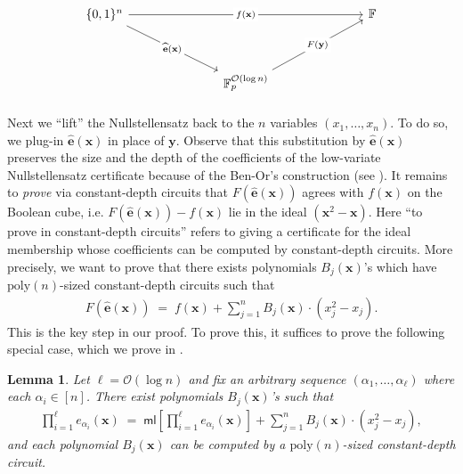 \documentclass[11pt]{article}
\newtheorem{lemma}[theorem]{Lemma}
\newcommand{\bigO}{\mathcal{O}}
\newcommand{\brac}[1]{\left[ #1 \right]}
\newcommand{\ml}{\mathsf{ml}}
\begin{document}
\[\begin{tikzcd}
	{\{0,1\}^{n}} &&&&&& {\mathbb{F}} \\
	\\
	&&& {\mathbb{F}_{p}^{\mathcal{O}(\log n)}}
	\arrow["{f(\mathbf{x})}"{description}, from=1-1, to=1-7]
	\arrow["{\widehat{\mathbf{e}}(\mathbf{x})}"{description}, from=1-1, to=3-4]
	\arrow["{F(\mathbf{y})}"{description}, from=3-4, to=1-7]
\end{tikzcd}\]



\paragraph{}Next we ``lift'' the Nullstellensatz back to the $n$ variables $(x_{1},\ldots,x_{n})$. To do so, we plug-in $\widehat{\mathbf{e}}(\mathbf{x})$ in place of $\mathbf{y}$. Observe that this substitution by $\widehat{\mathbf{e}}(\mathbf{x})$ preserves the size and the depth of the coefficients of the low-variate Nullstellensatz certificate because of the Ben-Or's construction (see ).\newline
It remains to \emph{prove} via constant-depth circuits that $F(\widehat{\mathbf{e}}(\mathbf{x}))$ agrees with $f(\mathbf{x})$ on the Boolean cube, i.e. $F(\widehat{\mathbf{e}}(\mathbf{x})) - f(\mathbf{x})$ lie in the ideal $(\mathbf{x}^{2} - \mathbf{x})$. Here ``to prove in constant-depth circuits'' refers to giving a certificate for the ideal membership whose coefficients can be computed by constant-depth circuits. More precisely, we want to prove that there exists polynomials $B_{j}(\mathbf{x})$'s which have $\mathrm{poly}(n)$-sized constant-depth circuits such that
\begin{align*}
    F(\widehat{\mathbf{e}}(\mathbf{x})) \; = \; f(\mathbf{x}) + \sum_{j=1}^{n} B_{j}(\mathbf{x}) \cdot (x_{j}^{2} - x_{j}).
\end{align*}
This is the key step in our proof. To prove this, it suffices to prove the following special case, which we prove in .



\begin{lemma}
Let $\ell = \bigO(\log n)$ and fix an arbitrary sequence $(\alpha_{1},\ldots,\alpha_{\ell})$ where each $\alpha_{i} \in [n]$. There exist polynomials $B_{j}(\mathbf{x})$'s such that
\begin{align*}
    \prod_{i = 1}^{\ell} e_{\alpha_{i}}(\mathbf{x}) \; = \; \ml\brac{\prod_{i = 1}^{\ell} e_{\alpha_{i}}(\mathbf{x})} + \sum_{j=1}^{n} B_{j}(\mathbf{x}) \cdot (x_{j}^{2} - x_{j}),
\end{align*}
and each polynomial $B_{j}(\mathbf{x})$ can be computed by a $\mathrm{poly}(n)$-sized constant-depth circuit. 
\end{lemma}
\end{document}

